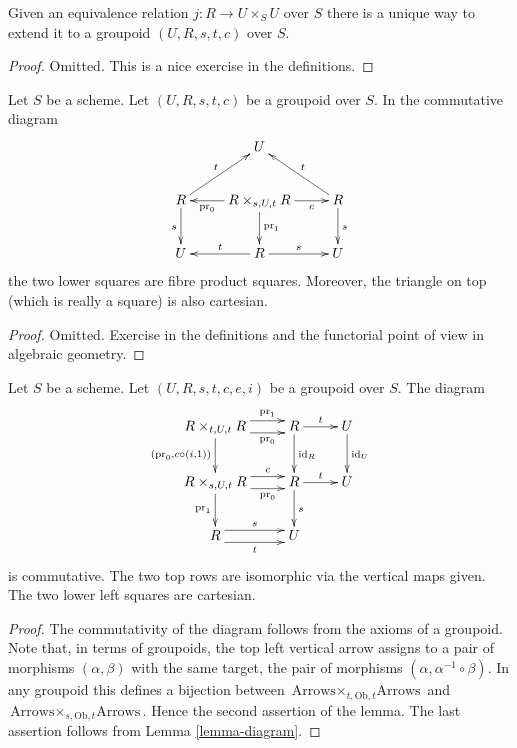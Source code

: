 \begin{lemma}
\label{lemma-equivalence-groupoid}
Given an equivalence relation $j : R \to U \times_S U$ over $S$
there is a unique way to extend it to a groupoid
$(U, R, s, t, c)$ over $S$.
\end{lemma}

\begin{proof}
Omitted.
This is a nice exercise in the definitions.
\end{proof}

\begin{lemma}
\label{lemma-diagram}
Let $S$ be a scheme.
Let $(U, R, s, t, c)$ be a groupoid over $S$.
In the commutative diagram
$$
\xymatrix{
& U & \\
R \ar[d]_s \ar[ru]^t &
R \times_{s, U, t} R
\ar[l]^-{\text{pr}_0} \ar[d]^{\text{pr}_1} \ar[r]_-c &
R \ar[d]^s \ar[lu]_t \\
U & R \ar[l]_t \ar[r]^s & U
}
$$
the two lower squares are fibre product squares.
Moreover, the triangle on top (which is really a square)
is also cartesian.
\end{lemma}

\begin{proof}
Omitted.
Exercise in the definitions and the functorial point of
view in algebraic geometry.
\end{proof}

\begin{lemma}
\label{lemma-diagram-pull}
Let $S$ be a scheme.
Let $(U, R, s, t, c, e, i)$ be a groupoid over $S$.
The diagram
\begin{equation}
\label{equation-pull}
\xymatrix{
R \times_{t, U, t} R
\ar@<1ex>[r]^-{\text{pr}_1} \ar@<-1ex>[r]_-{\text{pr}_0}
\ar[d]_{(\text{pr}_0, c \circ (i, 1))} &
R \ar[r]^t \ar[d]^{\text{id}_R} &
U \ar[d]^{\text{id}_U} \\
R \times_{s, U, t} R
\ar@<1ex>[r]^-c \ar@<-1ex>[r]_-{\text{pr}_0} \ar[d]_{\text{pr}_1} &
R \ar[r]^t \ar[d]^s &
U \\
R \ar@<1ex>[r]^s \ar@<-1ex>[r]_t &
U
}
\end{equation}
is commutative. The two top rows are isomorphic via the vertical maps given.
The two lower left squares are cartesian.
\end{lemma}

\begin{proof}
The commutativity of the diagram follows from the axioms of a groupoid.
Note that, in terms of groupoids, the top left vertical arrow assigns to
a pair of morphisms $(\alpha, \beta)$ with the same target, the pair
of morphisms $(\alpha, \alpha^{-1} \circ \beta)$. In any groupoid
this defines a bijection between
$\text{Arrows} \times_{t, \text{Ob}, t} \text{Arrows}$
and
$\text{Arrows} \times_{s, \text{Ob}, t} \text{Arrows}$. Hence the second
assertion of the lemma.
The last assertion follows from Lemma \ref{lemma-diagram}.
\end{proof}

